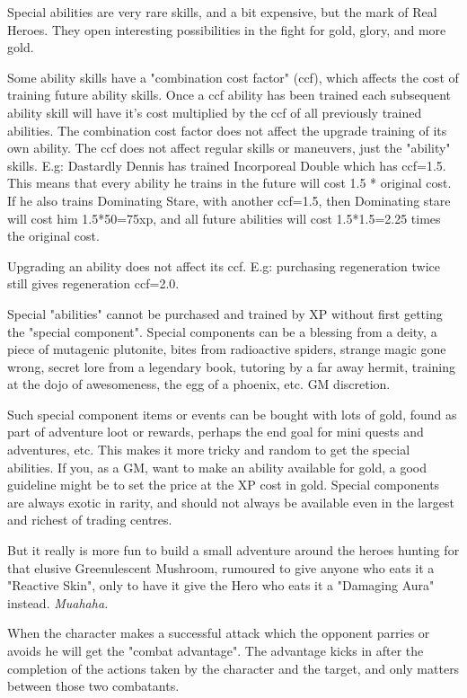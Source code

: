 Special abilities are very rare skills, and a bit expensive, but the mark of Real Heroes. They open interesting possibilities in the fight for gold, glory, and more gold.

Some ability skills have a "combination cost factor" (ccf), which affects the cost of training future ability skills. Once a ccf ability has been trained each subsequent ability skill will have it's cost multiplied by the ccf of all previously trained abilities. The combination cost factor does not affect the upgrade training of its own ability. The ccf does not affect regular skills or maneuvers, just the "ability" skills. 
E.g: Dastardly Dennis has trained Incorporeal Double which has ccf=1.5. This means that every ability he trains in the future will cost 1.5 * original cost. If he also trains Dominating Stare, with another ccf=1.5, then Dominating stare will cost him 1.5*50=75xp, and all future abilities will cost 1.5*1.5=2.25 times the original cost.

Upgrading an ability does not affect its ccf. E.g: purchasing regeneration twice still gives regeneration ccf=2.0.

Special "abilities" cannot be purchased and trained by XP without first getting the "special component". Special components can be a blessing from a deity, a piece of mutagenic plutonite, bites from radioactive spiders, strange magic gone wrong, secret lore from a legendary book, tutoring by a far away hermit, training at the dojo of awesomeness, the egg of a phoenix, etc. GM discretion.

Such special component items or events can be bought with lots of gold, found as part of adventure loot or rewards, perhaps the end goal for mini quests and adventures, etc. This makes it more tricky and random to get the special abilities. If you, as a GM, want to make an ability available for gold, a good guideline might be to set the price at the XP cost in gold. Special components are always exotic in rarity, and should not always be available even in the largest and richest of trading centres.

But it really is more fun to build a small adventure around the heroes hunting for that elusive Greenulescent Mushroom, rumoured to give anyone who eats it a "Reactive Skin", only to have it give the Hero who eats it a "Damaging Aura" instead. \emph{Muahaha.}


\openskillslist

 When the character makes a successful attack which the opponent parries or avoids he will get the "combat advantage". The advantage kicks in after the completion of the actions taken by the character and the target, and only matters between those two combatants.

